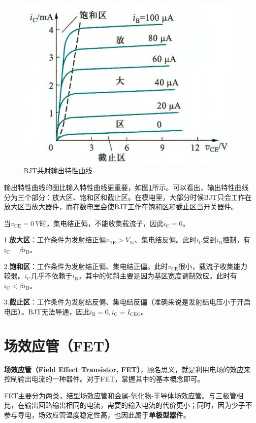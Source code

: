 \begin{figure}[htb]
    \centering
    \includegraphics[width=0.45\linewidth]{pic/BJT共射输出特性曲线.png}
    \caption{BJT共射输出特性曲线\cite{康华光}\label{BJT共射输出特性曲线}}
\end{figure}

输出特性曲线的图比输入特性曲线更重要，如图\ref{BJT共射输出特性曲线}所示。可以看出，输出特性曲线分为三个部分：放大区、饱和区和截止区。在模电里，大部分时候BJT只会工作在放大区当放大器件，而在数电里会使BJT工作在饱和区和截止区当开关器件。

当$v_{\mathrm{CE}}=\qty{0}{V}$时，集电结正偏，不能收集载流子，因此$i_{\mathrm{C}}=0$。

1.\textbf{放大区}：工作条件为发射结正偏$v_{\mathrm{BE}}>V_{\mathrm{th}}$、集电结反偏。此时$i_{\mathrm{C}}$受到$i_{\mathrm{B}}$控制，有$i_{\mathrm{C}}=\beta i_{\mathrm{B}}$。

2.\textbf{饱和区}：工作条件为发射结正偏、集电结正偏。此时$v_{\mathrm{CE}}$很小，载流子收集能力较弱。$i_{\mathrm{C}}$几乎不依赖于$i_{\mathrm{B}}$，其中的倾斜主要是因为基区宽度调制效应。此时有$i_{\mathrm{C}}<\beta i_{\mathrm{B}}$。

3.\textbf{截止区}：工作条件为发射结反偏、集电结反偏（准确来说是发射结电压小于开启电压）。BJT无法导通，因此$i_{\mathrm{B}}=0,i_{\mathrm{C}}=I_{\mathrm{CEO}}$。

\section{场效应管（FET）}
\textbf{场效应管（Field Effect Transistor, FET）}，顾名思义，就是利用电场的效应来控制输出电流的一种器件。对于FET，掌握其中的基本概念即可。

FET主要分为两类，结型场效应管和金属-氧化物-半导体场效应管。与三极管相比，在输出回路输出相同的电流，需要的输入电流的代价更小；同时，因为少子不参与导电，场效应管温度稳定性高，也因此属于\textbf{单极型器件}。

